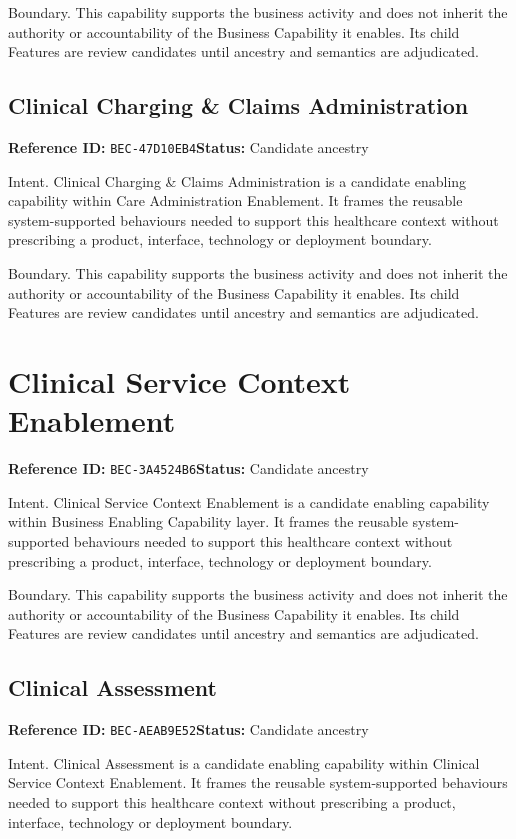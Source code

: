 \documentclass[11pt,a4paper,openany]{book}
\begin{document}
Boundary. This capability supports the business activity and does not inherit the authority or accountability of the Business Capability it enables. Its child Features are review candidates until ancestry and semantics are adjudicated.

\section{Clinical Charging \& Claims Administration}\label{cap:bec-47d10eb4}
\noindent\textbf{Reference ID:} \texttt{BEC-47D10EB4}\quad \textbf{Status:} Candidate ancestry\par
Intent. Clinical Charging \& Claims Administration is a candidate enabling capability within Care Administration Enablement. It frames the reusable system-supported behaviours needed to support this healthcare context without prescribing a product, interface, technology or deployment boundary.

Boundary. This capability supports the business activity and does not inherit the authority or accountability of the Business Capability it enables. Its child Features are review candidates until ancestry and semantics are adjudicated.

\chapter{Clinical Service Context Enablement}\label{cap:bec-3a4524b6}
\noindent\textbf{Reference ID:} \texttt{BEC-3A4524B6}\quad \textbf{Status:} Candidate ancestry\par
Intent. Clinical Service Context Enablement is a candidate enabling capability within Business Enabling Capability layer. It frames the reusable system-supported behaviours needed to support this healthcare context without prescribing a product, interface, technology or deployment boundary.

Boundary. This capability supports the business activity and does not inherit the authority or accountability of the Business Capability it enables. Its child Features are review candidates until ancestry and semantics are adjudicated.

\section{Clinical Assessment}\label{cap:bec-aeab9e52}
\noindent\textbf{Reference ID:} \texttt{BEC-AEAB9E52}\quad \textbf{Status:} Candidate ancestry\par
Intent. Clinical Assessment is a candidate enabling capability within Clinical Service Context Enablement. It frames the reusable system-supported behaviours needed to support this healthcare context without prescribing a product, interface, technology or deployment boundary.
\end{document}
